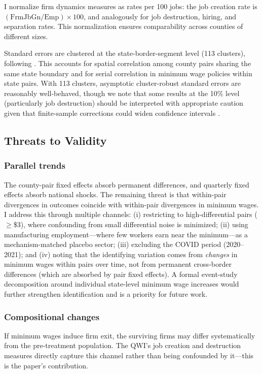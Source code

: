 \documentclass[12pt]{article}
\begin{document}
I normalize firm dynamics measures as rates per 100 jobs: the job creation rate is $(\text{FrmJbGn}/\text{Emp}) \times 100$, and analogously for job destruction, hiring, and separation rates. This normalization ensures comparability across counties of different sizes.

Standard errors are clustered at the state-border-segment level (113 clusters), following \citet{dube2010minimum}. This accounts for spatial correlation among county pairs sharing the same state boundary and for serial correlation in minimum wage policies within state pairs. With 113 clusters, asymptotic cluster-robust standard errors are reasonably well-behaved, though we note that some results at the 10\% level (particularly job destruction) should be interpreted with appropriate caution given that finite-sample corrections could widen confidence intervals \citep{rambachan2023more}.

\subsection{Threats to Validity}

\subsubsection*{Parallel trends} The county-pair fixed effects absorb permanent differences, and quarterly fixed effects absorb national shocks. The remaining threat is that within-pair divergences in outcomes coincide with within-pair divergences in minimum wages. I address this through multiple channels: (i) restricting to high-differential pairs ($\geq$\$3), where confounding from small differential noise is minimized; (ii) using manufacturing employment---where few workers earn near the minimum---as a mechanism-matched placebo sector; (iii) excluding the COVID period (2020--2021); and (iv) noting that the identifying variation comes from \textit{changes} in minimum wages within pairs over time, not from permanent cross-border differences (which are absorbed by pair fixed effects). A formal event-study decomposition around individual state-level minimum wage increases would further strengthen identification and is a priority for future work.

\subsubsection*{Compositional changes} If minimum wages induce firm exit, the surviving firms may differ systematically from the pre-treatment population. The QWI's job creation and destruction measures directly capture this channel rather than being confounded by it---this is the paper's contribution.
\end{document}
